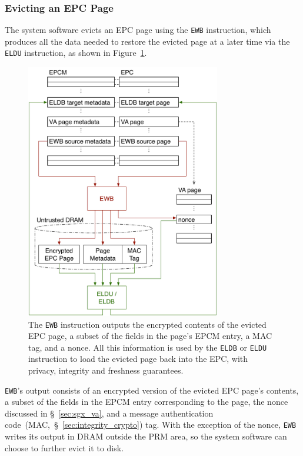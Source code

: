 \subsubsection{Evicting an EPC Page}
\label{sec:sgx_ewb}

The system software evicts an EPC page using the \texttt{EWB} instruction,
which produces all the data needed to restore the evicted page at a later time
via the \texttt{ELDU} instruction, as shown in Figure~\ref{fig:sgx_eviction}.

\begin{figure}[hbt]
  \centering
  \includegraphics[width=85mm]{figures/sgx_eviction.pdf}
  \caption{
    The \texttt{EWB} instruction outputs the encrypted contents of the
    evicted EPC page, a subset of the fields in the page's EPCM entry, a
    MAC tag, and a nonce. All this information is used by the \texttt{ELDB} or
    \texttt{ELDU} instruction to load the evicted page back into the EPC, with
    privacy, integrity and freshness guarantees.
  }
  \label{fig:sgx_eviction}
\end{figure}


\texttt{EWB}'s output consists of an encrypted version of the evicted EPC
page's contents, a subset of the fields in the EPCM entry corresponding to the
page, the nonce discussed in \S~\ref{sec:sgx_va}, and a message authentication
code~(MAC,~\S~\ref{sec:integrity_crypto}) tag. With the exception of the nonce,
\texttt{EWB} writes its output in DRAM outside the PRM area, so the system
software can choose to further evict it to disk.


